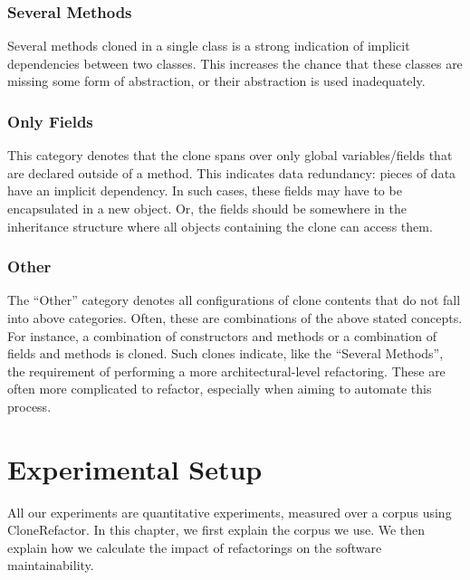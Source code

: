 \documentclass[runningheads]{llncs}
\begin{document}
\subsubsection{Several Methods}
Several methods cloned in a single class is a strong indication of implicit dependencies between two classes. This increases the chance that these classes are missing some form of abstraction, or their abstraction is used inadequately. %

\subsubsection{Only Fields}
This category denotes that the clone spans over only global variables/fields that are declared outside of a method. This indicates data redundancy: pieces of data have an implicit dependency. In such cases, these fields may have to be encapsulated in a new object. Or, the fields should be somewhere in the inheritance structure where all objects containing the clone can access them. %

\subsubsection{Other}
The ``Other'' category denotes all configurations of clone contents that do not fall into above categories. Often, these are combinations of the above stated concepts. For instance, a combination of constructors and methods or a combination of fields and methods is cloned. Such clones indicate, like the ``Several Methods'', the requirement of performing a more architectural-level refactoring. These are often more complicated to refactor, especially when aiming to automate this process.

\section{Experimental Setup}
All our experiments are quantitative experiments, measured over a corpus using CloneRefactor. In this chapter, we first explain the corpus we use. We then explain how we calculate the impact of refactorings on the software maintainability.
\end{document}
